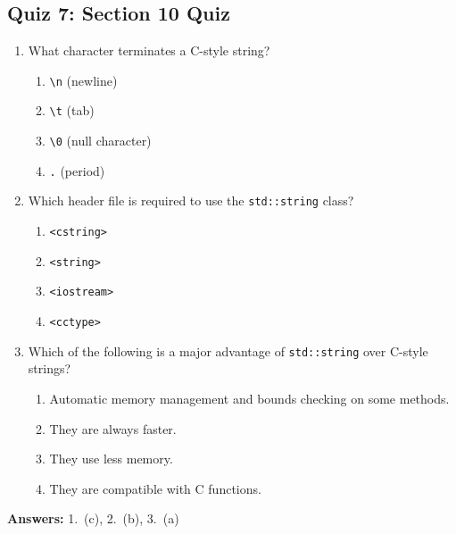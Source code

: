 \subsection{Quiz 7: Section 10 Quiz}
\begin{enumerate}
	\item What character terminates a C-style string?
	\begin{enumerate}
		\item[a)] \texttt{\textbackslash{}n} (newline)
		\item[b)] \texttt{\textbackslash{}t} (tab)
		\item[c)] \texttt{\textbackslash{}0} (null character)
		\item[d)] \texttt{.} (period)
	\end{enumerate}

	\item Which header file is required to use the \texttt{std::string} class?
	\begin{enumerate}
		\item[a)] \texttt{<cstring>}
		\item[b)] \texttt{<string>}
		\item[c)] \texttt{<iostream>}
		\item[d)] \texttt{<cctype>}
	\end{enumerate}

	\item Which of the following is a major advantage of \texttt{std::string} over C-style strings?
	\begin{enumerate}
		\item[a)] Automatic memory management and bounds checking on some methods.
		\item[b)] They are always faster.
		\item[c)] They use less memory.
		\item[d)] They are compatible with C functions.
	\end{enumerate}
\end{enumerate}

\textbf{Answers:} 1.\ (c), 2.\ (b), 3.\ (a)

